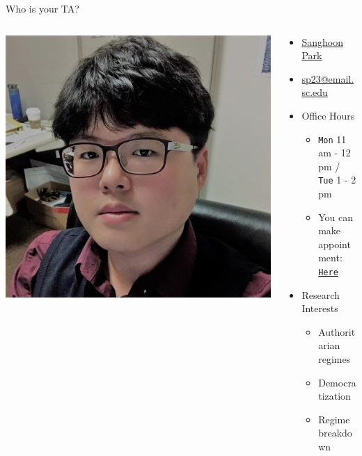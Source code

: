 \documentclass[xcolor=dvipsnames]{beamer}
\begin{document}
	\begin{frame}[fragile]{Who is your TA?}
		\begin{columns}[T]
			\begin{column}{0.36\textwidth}
				\includegraphics[width=1\linewidth]{avatar.jpg}
			\end{column}
			
			\begin{column}{0.6\textwidth}
				\begin{itemize}
					\item \href{shpark.netlify.app}{Sanghoon Park}
					\item \href{sp23@email.sc.edu}{sp23@email.sc.edu}
					\item Office Hours
					\begin{itemize}
						\item \texttt{Mon} 11 am - 12 pm / \texttt{Tue} 1 - 2 pm
						\item You can make appointment: \href{https://calendly.com/sanghoon}{\texttt{Here}}
					\end{itemize}
					\item Research Interests
					\begin{itemize} 
						\item Authoritarian regimes
						\item Democratization
						\item Regime breakdown
					\end{itemize}
				\end{itemize}
			\end{column}
		\end{columns}
	\end{frame}
	
\end{document}
